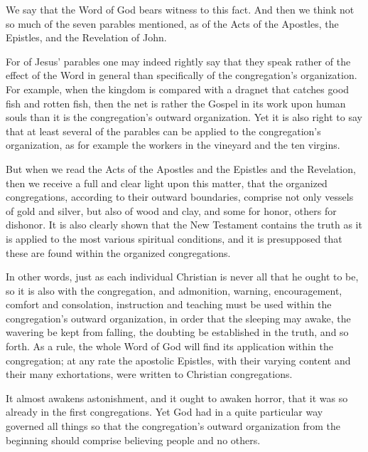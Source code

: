 We say that the Word of God bears witness to this fact. And then we think not so much of the seven parables mentioned, as of the Acts of the Apostles, the Epistles, and the Revelation of John.

For of Jesus’ parables one may indeed rightly say that they speak rather of the effect of the Word in general than specifically of the congregation’s organization. For example, when the kingdom is compared with a dragnet that catches good fish and rotten fish, then the net is rather the Gospel in its work upon human souls than it is the congregation’s outward organization. Yet it is also right to say that at least several of the parables can be applied to the congregation’s organization, as for example the workers in the vineyard and the ten virgins.

But when we read the Acts of the Apostles and the Epistles and the Revelation, then we receive a full and clear light upon this matter, that the organized congregations, according to their outward boundaries, comprise not only vessels of gold and silver, but also of wood and clay, and some for honor, others for dishonor. It is also clearly shown that the New Testament contains the truth as it is applied to the most various spiritual conditions, and it is presupposed that these are found within the organized congregations.

In other words, just as each individual Christian is never all that he ought to be, so it is also with the congregation, and admonition, warning, encouragement, comfort and consolation, instruction and teaching must be used within the congregation’s outward organization, in order that the sleeping may awake, the wavering be kept from falling, the doubting be established in the truth, and so forth. As a rule, the whole Word of God will find its application within the congregation; at any rate the apostolic Epistles, with their varying content and their many exhortations, were written to Christian congregations.

It almost awakens astonishment, and it ought to awaken horror, that it was so already in the first congregations. Yet God had in a quite particular way governed all things so that the congregation’s outward organization from the beginning should comprise believing people and no others.

